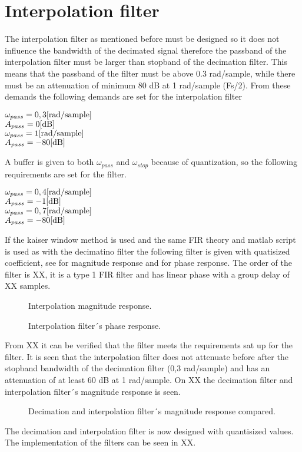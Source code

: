 \section{Interpolation filter} \label{sec:IntFilter}
The interpolation filter as mentioned before must be designed so it does not influence the bandwidth of the decimated signal therefore the passband of the interpolation filter must be larger than stopband of the decimation filter. This means that the passband of the filter must be above 0.3 rad/sample, while there must be an attenuation of minimum 80 dB at 1 rad/sample (Fs/2). From these demands the following demands are set for the interpolation filter

$\omega_{pass}=0,3 \enhed{rad/sample}$\\
$A_{pass}=0 \enhed{dB}$\\
$\omega_{pass}=1 \enhed{rad/sample}$\\
$A_{pass}=-80 \enhed{dB}$

A buffer is given to both $\omega_{pass}$ and $\omega_{stop}$ because of quantization, so the following requirements are set for the filter.

$\omega_{pass}=0,4 \enhed{rad/sample}$\\
$A_{pass}=-1 \enhed{dB}$\\
$\omega_{pass}=0,7 \enhed{rad/sample}$\\
$A_{pass}=-80 \enhed{dB}$

 If the kaiser window method is used and the same FIR theory and matlab script is used as with the decimatino filter the following filter is given with quatisized coefficient, see for magnitude response and for phase response. The order of the filter is XX, it is a type 1 FIR filter and has linear phase with a group delay of XX samples.

\begin{figure}[H]
	\centering
	
	\caption{Interpolation magnitude response.}
	\label{fig:IntMag}
\end{figure}

\begin{figure}[H]
	\centering
	
	\caption{Interpolation filter´s phase response.}
	\label{fig:IntPhase}
\end{figure}

From XX it can be verified that the filter meets the requirements sat up for the filter. It is seen that the interpolation filter does not attenuate before after the stopband bandwidth of the decimation filter (0,3 rad/sample) and has an attenuation of at least 60 dB at 1 rad/sample. On XX the decimation filter and interpolation filter´s magnitude response is seen.  

\begin{figure}[H]
	\centering
	
	\caption{Decimation and interpolation filter´s magnitude response compared.}
	\label{fig:decIntComp}
\end{figure}


The decimation and interpolation filter is now designed with quantisized values. The implementation of the filters can be seen in XX.    